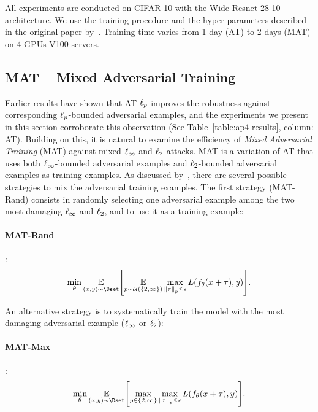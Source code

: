 All experiments are conducted on CIFAR-10 with the Wide-Resnet 28-10 architecture.
We use the training procedure and the hyper-parameters described in the original paper by~\citet{zagoruyko2016wide}.
Training time varies from 1 day (AT) to 2 days (MAT) on 4 GPUs-V100 servers. 


\subsection{MAT -- Mixed Adversarial Training}
\label{subsection:ap4-mixed_adversarial_training}

Earlier results have shown that AT-$\ell_p $ improves the robustness against corresponding $\ell_p $-bounded adversarial examples, and the experiments we present in this section corroborate this observation (See Table~\ref{table:ap4-results}, column: AT).
Building on this, it is natural to examine the efficiency of \emph{Mixed Adversarial Training} (MAT) against mixed $\ell_\infty $ and $\ell_2 $ attacks.
MAT is a variation of AT that uses both $\ell_\infty $-bounded adversarial examples and $\ell_2 $-bounded adversarial examples as training examples.
As discussed by~\citet{tramer2019adversarial}, there are several possible strategies to mix the adversarial training examples.
The first strategy (MAT-Rand) consists in randomly selecting one adversarial example among the two most damaging $\ell_\infty $ and $\ell_2 $, and to use it as a training example:

\paragraph{MAT-Rand}:
\begin{equation} \label{equation:ap4-mat_rand}
  \min_{\theta} \Ebb_{(x, y) \sim \Dset} \left[\Ebb_{p\sim\mathcal{U}({\{2, \infty\})}} \max_{\norm{\tau}_p \leq \epsilon} L \left( f_{\theta}(x+\tau), y \right) \right].
\end{equation}

An alternative strategy is to systematically train the model with the most damaging adversarial example ($\ell_\infty $ or $\ell_2 $):
\paragraph{MAT-Max}:
\begin{equation} \label{equation:ap4-mat_max}
  \min_{\theta} \Ebb_{(x, y) \sim \Dset} \left[ \max_{p \in \{2, \infty\}} \max_{\norm{\tau}_p \leq \epsilon} L \left( f_{\theta}(x+\tau), y \right) \right].
\end{equation}

